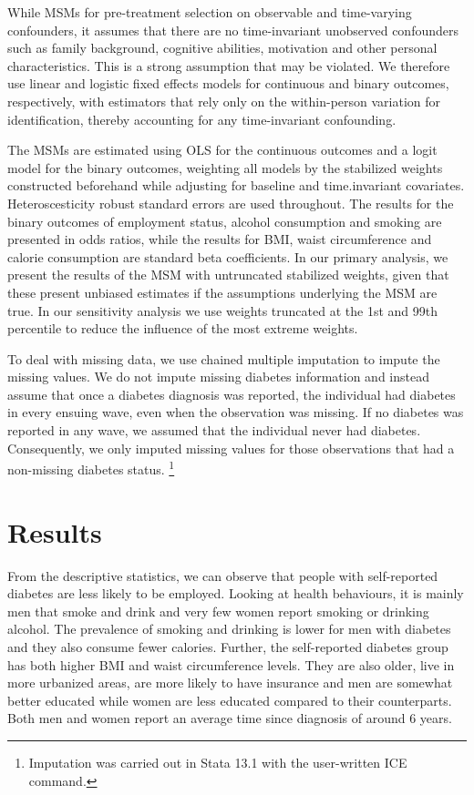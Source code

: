 While \acp{MSM} for pre-treatment selection on observable and time-varying confounders, it assumes that there are no time-invariant unobserved confounders such as family background, cognitive abilities, motivation and other personal characteristics. This is a strong assumption that may be violated. We therefore use linear and logistic fixed effects models for continuous and binary outcomes, respectively,  with estimators that rely only on the within-person variation for identification, thereby accounting for any time-invariant confounding.

The \acp{MSM} are estimated using \ac{OLS} for the continuous outcomes and a logit model for the binary outcomes, weighting all models by the stabilized weights constructed beforehand while adjusting for baseline and time.invariant covariates. Heteroscesticity robust standard errors are used throughout. The results for the binary outcomes of employment status, alcohol consumption and smoking are presented in odds ratios, while the results for \ac{BMI}, waist circumference and calorie consumption are standard beta coefficients. In our primary analysis, we present the results of the \ac{MSM} with untruncated stabilized weights, given that these present unbiased estimates if the assumptions underlying the \ac{MSM} are true. In our sensitivity analysis we use weights truncated at the 1st and 99th percentile to reduce the influence of the most extreme weights.

To deal with missing data, we use chained multiple imputation to impute the missing values. We do not impute missing diabetes information and instead assume that once a diabetes diagnosis was reported, the individual had diabetes in every ensuing wave, even when the observation was missing. If no diabetes was reported in any wave, we assumed that the individual never had diabetes. Consequently, we only imputed missing values for those observations that had a non-missing diabetes status. \footnote{Imputation was carried out in Stata 13.1 with the user-written ICE command.}

\section*{Results}

From the descriptive statistics, we can observe that people with self-reported diabetes are less likely to be employed. Looking at health behaviours, it is mainly men that smoke and drink and very few women report smoking or drinking alcohol. The prevalence of smoking and drinking is lower for men with diabetes and they also consume fewer calories. Further, the self-reported diabetes group has both higher \ac{BMI} and waist circumference levels. They are also older, live in more urbanized areas, are more likely to have insurance and men are somewhat better educated while women are less educated compared to their counterparts. Both men and women report an average time since diagnosis of around 6 years.



